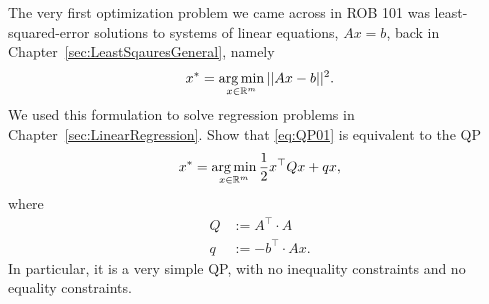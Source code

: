 \begin{example}
\label{ex:LeastSquaredErrorQP}
The very first optimization problem we came across in ROB 101 was least-squared-error solutions to systems of linear equations, $Ax=b$, back in Chapter~\ref{sec:LeastSqauresGeneral}, namely 
\begin{equation}
    \label{eq:QP01}
    x^\ast = \operatorname*{arg\,min}_{x \in \mathbb R^m} ||Ax-b ||^2. 
\end{equation}
We used this formulation to solve regression problems in Chapter~\ref{sec:LinearRegression}. 
Show that \eqref{eq:QP01} is equivalent to the QP
\begin{equation}
    \label{eq:QP01b}
    x^\ast = \operatorname*{arg\,min}_{x \in \mathbb R^m} \frac{1}{2}x^\top Q x + q x,
\end{equation}
where
\begin{equation}
    \label{eq:QP01c}
    \begin{aligned}
        Q&:= A^\top \cdot A \\
        q &:=  -b^\top \cdot Ax.
    \end{aligned}
\end{equation}
In particular, it is a very simple QP, with no inequality constraints and no equality constraints.


\end{example}


